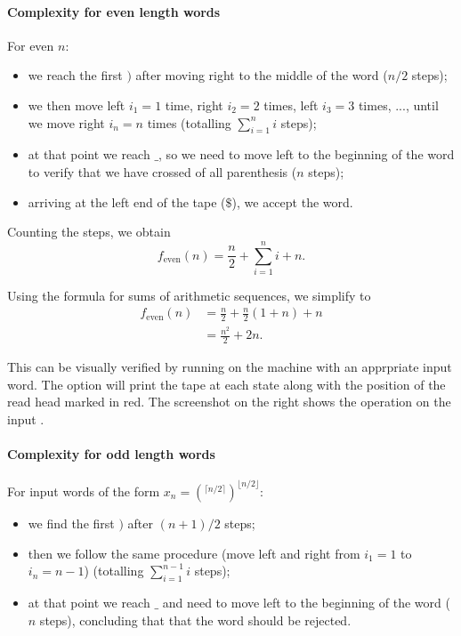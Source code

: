 \paragraph{Complexity for even length words}

For even $n$:

\begin{itemize}
    \item we reach the first $)$ after moving right to the middle of the word ($n/2$ steps);
    \item we then move left $i_1=1$ time, right $i_2=2$ times, left $i_3=3$ times, ..., until we move right $i_n=n$ times (totalling $\sum_{i=1}^{n}{i}$ steps);
    \item at that point we reach $\_$, so we need to move left to the beginning of the word to verify that we have crossed of all parenthesis ($n$ steps);
    \item arriving at the left end of the tape ($\$$), we accept the word. 
\end{itemize}

Counting the steps, we obtain
$$ f_{\text{even}}(n) = \frac{n}{2} + \sum_{i=1}^{n}{i} + n.$$

Using the formula for sums of arithmetic sequences, we simplify to
\begin{align*} 
    f_{\text{even}}(n)
    &= \frac{n}{2} + \frac{n}{2} \left( 1+n \right) + n \\
    &= \frac{n^2}{2} + 2n.
\end{align*}


This can be visually verified by running  on the  machine with an apprpriate input word. 
The  option will print the tape at each state along with the position of the read head marked in red. 
The screenshot on the right shows the operation on the input \code{((()))}.


\paragraph{Complexity for odd length words}
For input words of the form $x_n=(^{\lceil n/2 \rceil} )^{\lfloor n/2 \rfloor}$:
\begin{itemize}
    \item we find the first $)$ after $(n+1)/2$ steps;
    \item then we follow the same procedure (move left and right from $i_1=1$ to $i_n=n-1$) (totalling $\sum_{i=1}^{n-1}{i}$ steps);
    \item at that point we reach $\_$ and need to move left to the beginning of the word ($n$ steps), concluding that that the word should be rejected.
\end{itemize}

